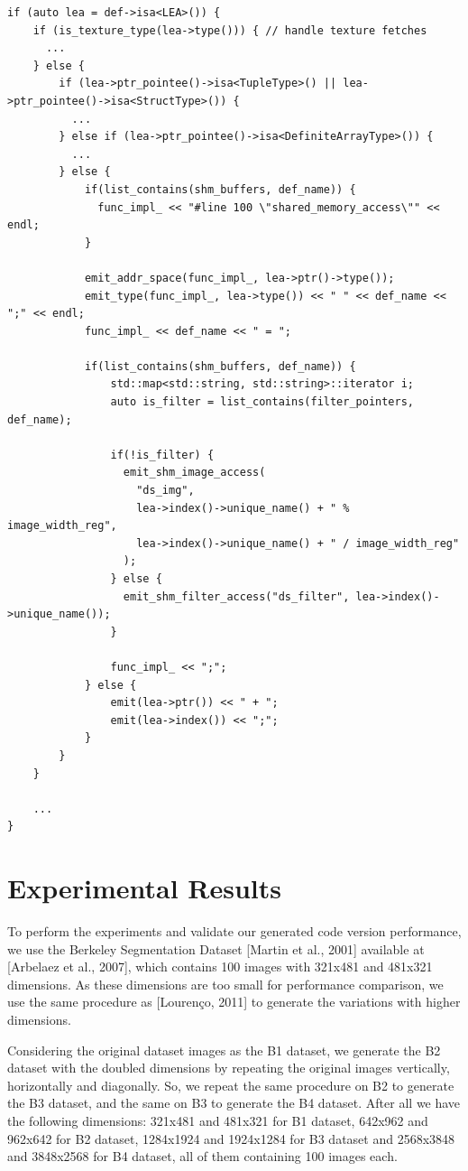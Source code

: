 \documentclass{article}
\begin{document}
\begin{verbatim}
if (auto lea = def->isa<LEA>()) {
    if (is_texture_type(lea->type())) { // handle texture fetches
      ...
    } else {
        if (lea->ptr_pointee()->isa<TupleType>() || lea->ptr_pointee()->isa<StructType>()) {
          ...
        } else if (lea->ptr_pointee()->isa<DefiniteArrayType>()) {
          ...
        } else {
            if(list_contains(shm_buffers, def_name)) {
              func_impl_ << "#line 100 \"shared_memory_access\"" << endl;
            }

            emit_addr_space(func_impl_, lea->ptr()->type());
            emit_type(func_impl_, lea->type()) << " " << def_name << ";" << endl;
            func_impl_ << def_name << " = ";

            if(list_contains(shm_buffers, def_name)) {
                std::map<std::string, std::string>::iterator i;
                auto is_filter = list_contains(filter_pointers, def_name);

                if(!is_filter) {
                  emit_shm_image_access(
                    "ds_img",
                    lea->index()->unique_name() + " % image_width_reg",
                    lea->index()->unique_name() + " / image_width_reg"
                  );
                } else {
                  emit_shm_filter_access("ds_filter", lea->index()->unique_name());
                }

                func_impl_ << ";"; 
            } else { 
                emit(lea->ptr()) << " + ";
                emit(lea->index()) << ";"; 
            }
        }
    }

    ...
}
\end{verbatim}

\section{Experimental Results}

To perform the experiments and validate our generated code version performance, we use the Berkeley Segmentation Dataset [Martin et al., 2001] available at [Arbelaez et al., 2007], which contains 100 images with 321x481 and 481x321 dimensions. As these dimensions are too small for performance comparison, we use the same procedure as [Lourenço, 2011] to generate the variations with higher dimensions.

Considering the original dataset images as the B1 dataset, we generate the B2 dataset with the doubled dimensions by repeating the original images vertically, horizontally and diagonally. So, we repeat the same procedure on B2 to generate the B3 dataset, and the same on B3 to generate the B4 dataset. After all we have the following dimensions: 321x481 and 481x321 for B1 dataset, 642x962 and 962x642 for B2 dataset, 1284x1924 and 1924x1284 for B3 dataset and 2568x3848 and 3848x2568 for B4 dataset, all of them containing 100 images each.
\end{document}
